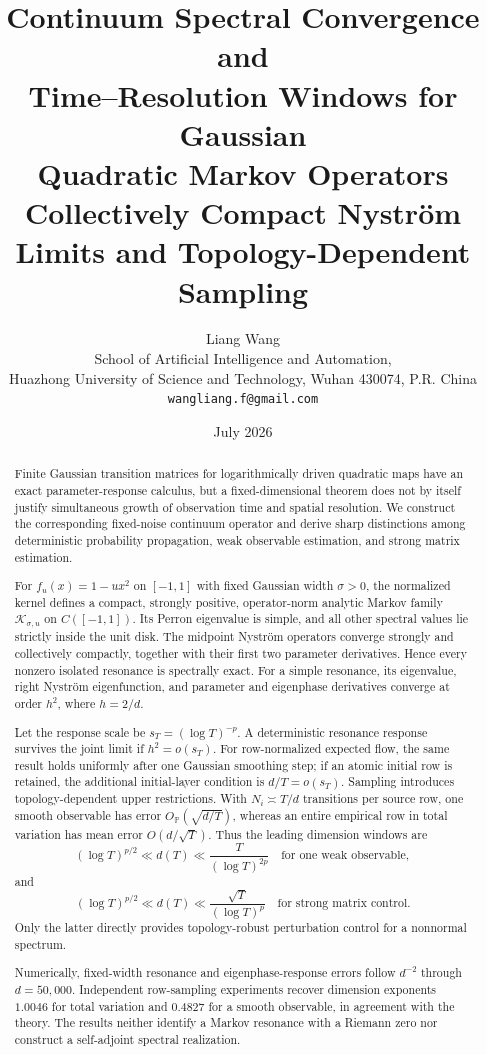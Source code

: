 \documentclass[11pt]{article}
\title{\textbf{Continuum Spectral Convergence and}\\
\textbf{Time--Resolution Windows for Gaussian}\\
\textbf{Quadratic Markov Operators}\\
\large Collectively Compact Nystr\"om Limits and Topology-Dependent Sampling}
\author{Liang Wang\\
\small School of Artificial Intelligence and Automation,\\[-0.2em]
\small Huazhong University of Science and Technology, Wuhan 430074, P.R. China\\
\small \texttt{wangliang.f@gmail.com}}
\date{July 2026}
\theoremstyle{definition}
\theoremstyle{remark}
\newcommand{\cK}{\mathcal K}
\begin{document}
\maketitle

\begin{abstract}
Finite Gaussian transition matrices for logarithmically driven quadratic maps
have an exact parameter-response calculus, but a fixed-dimensional theorem
does not by itself justify simultaneous growth of observation time and spatial
resolution.  We construct the corresponding fixed-noise continuum operator
and derive sharp distinctions among deterministic probability propagation,
weak observable estimation, and strong matrix estimation.

For $f_u(x)=1-u x^2$ on $[-1,1]$ with fixed Gaussian width $\sigma>0$, the
normalized kernel defines a compact, strongly positive, operator-norm analytic
Markov family $\cK_{\sigma,u}$ on $C([-1,1])$.  Its Perron eigenvalue is simple,
and all other spectral values lie strictly inside the unit disk.  The midpoint
Nystr\"om operators converge strongly and collectively compactly, together
with their first two parameter derivatives.  Hence every nonzero isolated
resonance is spectrally exact.  For a simple resonance, its eigenvalue,
right Nystr\"om eigenfunction, and parameter and eigenphase derivatives converge at
order $h^2$, where $h=2/d$.

Let the response scale be $s_T=(\log T)^{-p}$.  A deterministic resonance
response survives the joint limit if $h^2=o(s_T)$.  For row-normalized expected
flow, the same result holds uniformly after one Gaussian smoothing step; if an
atomic initial row is retained, the additional initial-layer condition is
$d/T=o(s_T)$.  Sampling introduces topology-dependent upper restrictions.
With $N_i\asymp T/d$ transitions per source row, one smooth observable has
error $O_{\mathbb P}(\sqrt{d/T})$, whereas an entire empirical row in total
variation has mean error $O(d/\sqrt T)$.  Thus the leading dimension windows
are
\[
  (\log T)^{p/2}\ll d(T)\ll\frac{T}{(\log T)^{2p}}
  \quad\text{for one weak observable},
\]
and
\[
  (\log T)^{p/2}\ll d(T)\ll\frac{\sqrt T}{(\log T)^p}
  \quad\text{for strong matrix control}.
\]
Only the latter directly provides topology-robust perturbation control for a
nonnormal spectrum.

Numerically, fixed-width resonance and eigenphase-response errors follow
$d^{-2}$ through $d=50{,}000$.  Independent row-sampling experiments recover
dimension exponents $1.0046$ for total variation and $0.4827$ for a smooth
observable, in agreement with the theory.  The results neither identify a
Markov resonance with a Riemann zero nor construct a self-adjoint spectral
realization.
\end{abstract}
\end{document}
